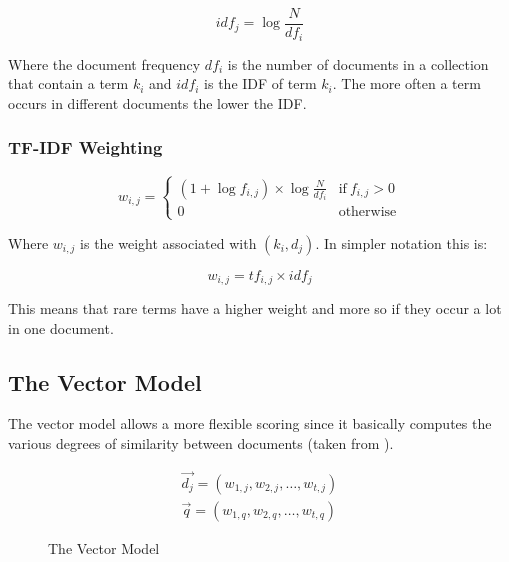 \begin{equation}
idf_j =
\log \frac{N}{df_i}
\end{equation}

Where the document frequency $df_i$ is the number of documents in a collection that contain a term $k_i$ and $idf_i$ is the IDF of term $k_i$. The more often a term occurs in different documents the lower the IDF.

\subsubsection{TF-IDF Weighting}

\begin{equation}
w_{i,j} =
\begin{cases}
\left(1+\log f_{i,j}\right)\times \log\frac{N}{df_i} & \text{if} \ f_{i,j} > 0 \\
0 & \text{otherwise}
\end{cases}
\end{equation}

Where $w_{i,j}$ is the weight associated with $\left(k_i,d_j\right)$. In simpler notation this is:

\begin{equation}
w_{i,j} = tf_{i,j}\times idf_j
\end{equation}

This means that rare terms have a higher weight and more so if they occur a lot in one document.

\subsection{The Vector Model}
The vector model allows a more flexible scoring since it basically computes the various degrees of similarity between documents (taken from \citep[p.78]{Baeza-Yates2011}).

\begin{align}
\vec{d_j} = \left(w_{1,j}, w_{2,j}, \ldots, w_{t,j} \right) \\
\vec{q} = \left(w_{1,q}, w_{2,q}, \ldots, w_{t,q} \right)
\end{align}

\begin{figure}[h] %
\centering
{}
\caption[Vector Model]{The Vector Model}
\label{fig:VM}
\end{figure}

